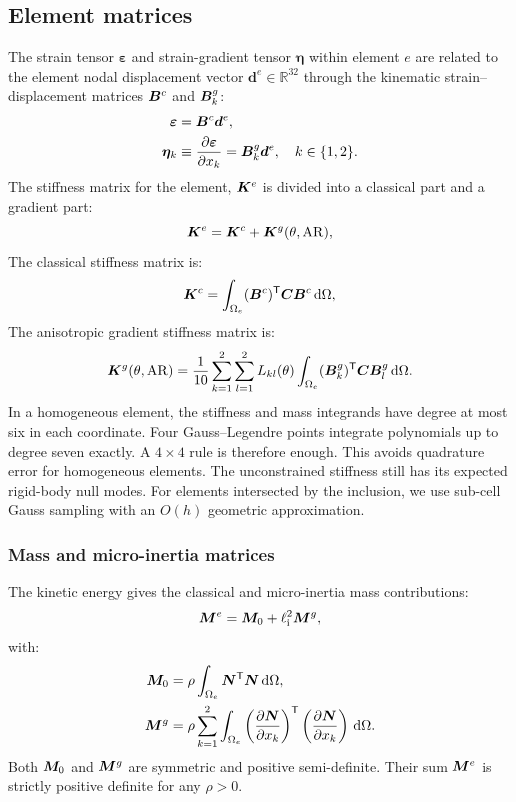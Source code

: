 \subsection{Element matrices}
The strain tensor $\bm\varepsilon$ and strain-gradient tensor $\bm\eta$ within element $e$ are related to the element nodal displacement vector $\bm{d}^e \in \mathbb{R}^{32}$ through the kinematic strain--displacement matrices $\bm{B}^c$ and $\bm{B}^g_k$:
\begin{equation}
\begin{split}
\bm\varepsilon &= \bm{B}^c \bm{d}^e,\\
\bm\eta_k &\equiv \frac{\partial \bm\varepsilon}{\partial x_k} = \bm{B}^g_k \bm{d}^e, \quad k \in \{1, 2\}.
\end{split}
\label{eq:strain_matrices}
\end{equation}
The stiffness matrix for the element, $\bm{K}^e$ is divided into a classical part and a gradient part:
\begin{equation}
\bm{K}^e = \bm{K}^c + \bm{K}^g(\theta, \mathrm{AR}),
\label{eq:Ke_total}
\end{equation}
The classical stiffness matrix is:
\begin{equation}
\bm{K}^c = \int_{\Omega_e} (\bm{B}^c)^\mathsf{T} \bm{C} \bm{B}^c \,\mathrm{d}\Omega,
\label{eq:Kc_int}
\end{equation}
The anisotropic gradient stiffness matrix is:
\begin{equation}
\bm{K}^g(\theta, \mathrm{AR}) = \frac{1}{10} \sum_{k=1}^2 \sum_{l=1}^2 L_{kl}(\theta) \int_{\Omega_e} (\bm{B}^g_k)^\mathsf{T} \bm{C} \bm{B}^g_l \,\mathrm{d}\Omega.
\label{eq:Kg_int}
\end{equation}
In a homogeneous element, the stiffness and mass integrands have degree at most six in each coordinate. Four Gauss--Legendre points integrate polynomials up to degree seven exactly. A $4\times4$ rule is therefore enough. This avoids quadrature error for homogeneous elements. The unconstrained stiffness still has its expected rigid-body null modes. For elements intersected by the inclusion, we use sub-cell Gauss sampling with an $O(h)$ geometric approximation.

\subsubsection{Mass and micro-inertia matrices}
The kinetic energy gives the classical and micro-inertia mass contributions:
\begin{equation}
\bm{M}^e = \bm{M}_0 + \ell_{\mathrm{i}}^2 \bm{M}^g,
\label{eq:Me_total}
\end{equation}
with:
\begin{equation}
\begin{split}
\bm{M}_0 &= \rho \int_{\Omega_e} \bm{N}^\mathsf{T} \bm{N} \,\mathrm{d}\Omega, \\
\bm{M}^g &= \rho \sum_{k=1}^2 \int_{\Omega_e} \left(\frac{\partial \bm{N}}{\partial x_k}\right)^\mathsf{T} \left(\frac{\partial \bm{N}}{\partial x_k}\right) \,\mathrm{d}\Omega.
\end{split}
\label{eq:Mg_int}
\end{equation}
Both $\bm{M}_0$ and $\bm{M}^g$ are symmetric and positive semi-definite. Their sum $\bm{M}^e$ is strictly positive definite for any $\rho > 0$.

